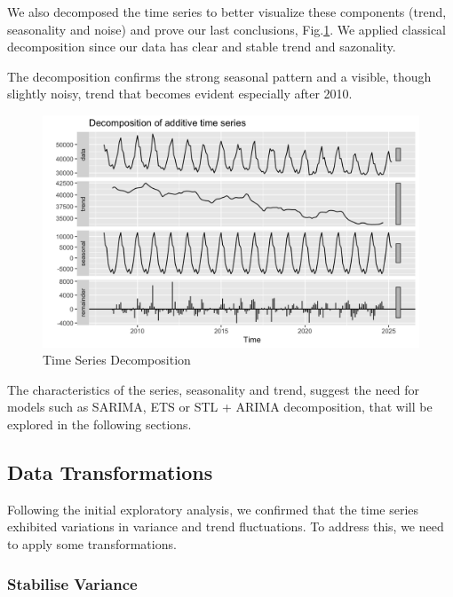 \vspace{0.5\baselineskip}


We also decomposed the time series to better visualize these components (trend, seasonality and noise) and prove our last conclusions, Fig.\ref{fig:f2}.
We applied classical decomposition since our data has clear and stable trend and sazonality.

The decomposition confirms the strong seasonal pattern and a visible, though slightly noisy, trend that becomes evident especially after 2010.

\begin{figure}[H]
    \centering
    \includegraphics[width=1\linewidth]{images/f2.png}
    \caption{Time Series Decomposition}
    \label{fig:f2}
\end{figure}

The characteristics of the series, seasonality and trend, suggest the need for models such as SARIMA, ETS or STL + ARIMA decomposition, that will be explored in the following sections.

\subsection{Data Transformations}
Following the initial exploratory analysis, we confirmed that the time series exhibited variations in variance and trend fluctuations. To address this, we need to apply some transformations.

\subsubsection{Stabilise Variance}

\vspace{0.5\baselineskip}

